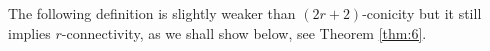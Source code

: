 \documentclass[10pt,a4paper]{amsart}
\newtheorem{teo}[lema]{Theorem}
\newcommand{\TC}{\textrm{TC}}
\begin{document}








The following definition is slightly weaker than $(2r+2)$-conicity but it still implies $r$-connectivity, as we shall show below, see Theorem \ref{thm:6}. 

\end{document}
